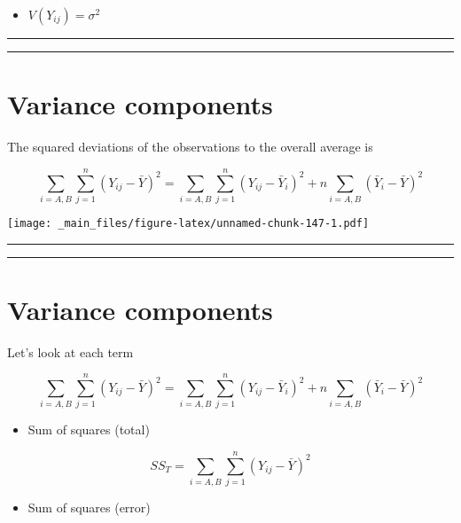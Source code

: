 \documentclass[
]{book}
\providecommand{\tightlist}{%
  \setlength{\itemsep}{0pt}\setlength{\parskip}{0pt}}
\begin{document}
\begin{itemize}
\tightlist
\item
  \(V(Y_{ij})=\sigma^2\)
\end{itemize}

\begin{center}\rule{0.5\linewidth}{0.5pt}\end{center}

\begin{center}\rule{0.5\linewidth}{0.5pt}\end{center}

\hypertarget{variance-components}{%
\section{Variance components}\label{variance-components}}

The squared deviations of the observations to the overall average is

\[\sum_{i=A,B}\sum_{j=1}^n(Y_{ij}-\bar{Y})^2= \sum_{i=A,B}\sum_{j=1}^n(Y_{ij}-\bar{Y}_i)^2+n\sum_{i=A,B}(\bar{Y}_{i}-\bar{Y})^2\]

\texttt{[image: \_main\_files/figure-latex/unnamed-chunk-147-1.pdf]}

\begin{center}\rule{0.5\linewidth}{0.5pt}\end{center}

\begin{center}\rule{0.5\linewidth}{0.5pt}\end{center}

\hypertarget{variance-components-1}{%
\section{Variance components}\label{variance-components-1}}

Let's look at each term

\[\sum_{i=A,B}\sum_{j=1}^n(Y_{ij}-\bar{Y})^2= \sum_{i=A,B}\sum_{j=1}^n(Y_{ij}-\bar{Y}_i)^2+n\sum_{i=A,B}(\bar{Y}_{i}-\bar{Y})^2\]

\begin{itemize}
\tightlist
\item
  Sum of squares (total)
\end{itemize}

\[SS_T=\sum_{i=A,B}\sum_{j=1}^n(Y_{ij}-\bar{Y})^2\]

\begin{itemize}
\tightlist
\item
  Sum of squares (error)
\end{itemize}
\end{document}
